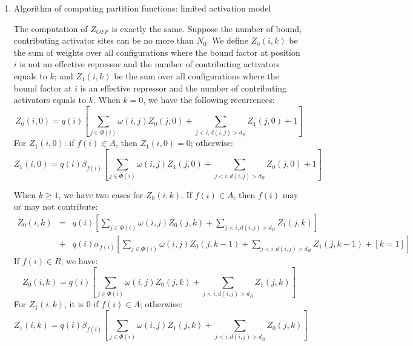 \documentclass[11pt]{article}
\begin{document}
\begin{enumerate}
\begin{enumerate}
\item Algorithm of computing partition functions: limited activation model

The computation of $Z_{OFF}$ is exactly the same. Suppose the number of bound, contributing activator sites can be no more than $N_0$. We define $Z_0(i,k)$ be the sum of weights over all configurations where the bound factor at position $i$ is not an effective repressor and the number of contributing activators equals to $k$; and $Z_1(i,k)$ be the sum over all configurations where the bound factor at $i$ is an effective repressor and the number of contributing activators equals to $k$. When $k = 0$, we have the following recurrences: 
\begin{equation}
Z_0(i,0) = q(i) \left[ \sum_{j \in \Phi(i)}\omega(i,j) Z_0(j,0) + \sum_{j<i, d(i,j)>d_R} Z_1(j,0) + 1	\right]
\end{equation}
For $Z_1(i,0)$: if $f(i) \in A$, then $Z_1(i,0) = 0$; otherwise: 
\begin{equation}
Z_1(i,0) = q(i) \beta_{f(i)} \left[ \sum_{j \in \Phi(i)}\omega(i,j) Z_1(j,0) + \sum_{j<i, d(i,j)>d_R} Z_0(j,0) + 1	\right]
\end{equation}

When $k \geq 1$, we have two cases for $Z_0(i,k)$. If $f(i) \in A$, then $f(i)$ may or may not contribute: 
\begin{equation}
\begin{array}{lll}
Z_0(i,k) & = & q(i) \left[ \sum_{j \in \Phi(i)}\omega(i,j) Z_0(j,k) + \sum_{j<i, d(i,j)>d_R} Z_1(j,k)	\right]\\
 & + & q(i) \alpha_{f(i)} \left[ \sum_{j \in \Phi(i)}\omega(i,j) Z_0(j,k-1) + \sum_{j<i, d(i,j)>d_R} Z_1(j,k-1)	+ [k=1] \right]
\end{array}
\end{equation}
If $f(i) \in R$, we have: 
\begin{equation}
Z_0(i,k) = q(i) \left[ \sum_{j \in \Phi(i)}\omega(i,j) Z_0(j,k) + \sum_{j<i, d(i,j)>d_R} Z_1(j,k)	\right]
\end{equation}
For $Z_1(i,k)$, it is 0 if $f(i) \in A$; otherwise: 
\begin{equation}
Z_1(i,k) = q(i) \beta_{f(i)} \left[ \sum_{j \in \Phi(i)}\omega(i,j) Z_1(j,k) + \sum_{j<i, d(i,j)>d_R} Z_0(j,k) \right]
\end{equation}


\end{enumerate}
\end{enumerate}
\end{document}
